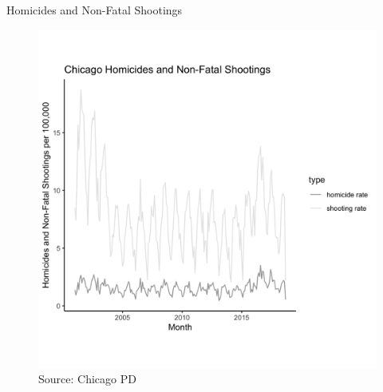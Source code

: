 \documentclass[10pt,ignorenonframetext,]{beamer}
\begin{document}
\begin{frame}{Homicides and Non-Fatal Shootings}
\protect\hypertarget{homicides-and-non-fatal-shootings}{}

\begin{figure}
\centering
\includegraphics{../chicago/figs/hnfs_t_plot.png}
\caption{Source: Chicago PD}
\end{figure}

\end{frame}
\end{document}
